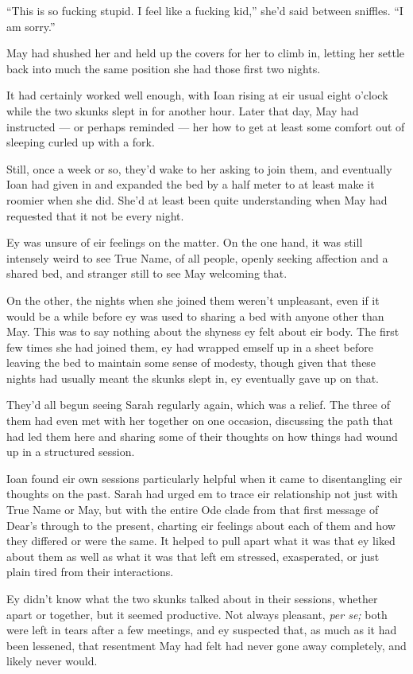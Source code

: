 ``This is so fucking stupid. I feel like a fucking kid,'' she'd said between sniffles. ``I am sorry.''

May had shushed her and held up the covers for her to climb in, letting her settle back into much the same position she had those first two nights.

It had certainly worked well enough, with Ioan rising at eir usual eight o'clock while the two skunks slept in for another hour. Later that day, May had instructed — or perhaps reminded — her how to get at least some comfort out of sleeping curled up with a fork.

Still, once a week or so, they'd wake to her asking to join them, and eventually Ioan had given in and expanded the bed by a half meter to at least make it roomier when she did. She'd at least been quite understanding when May had requested that it not be every night.

Ey was unsure of eir feelings on the matter. On the one hand, it was still intensely weird to see True Name, of all people, openly seeking affection and a shared bed, and stranger still to see May welcoming that.

On the other, the nights when she joined them weren't unpleasant, even if it would be a while before ey was used to sharing a bed with anyone other than May. This was to say nothing about the shyness ey felt about eir body. The first few times she had joined them, ey had wrapped emself up in a sheet before leaving the bed to maintain some sense of modesty, though given that these nights had usually meant the skunks slept in, ey eventually gave up on that.

They'd all begun seeing Sarah regularly again, which was a relief. The three of them had even met with her together on one occasion, discussing the path that had led them here and sharing some of their thoughts on how things had wound up in a structured session.

Ioan found eir own sessions particularly helpful when it came to disentangling eir thoughts on the past. Sarah had urged em to trace eir relationship not just with True Name or May, but with the entire Ode clade from that first message of Dear's through to the present, charting eir feelings about each of them and how they differed or were the same. It helped to pull apart what it was that ey liked about them as well as what it was that left em stressed, exasperated, or just plain tired from their interactions.

Ey didn't know what the two skunks talked about in their sessions, whether apart or together, but it seemed productive. Not always pleasant, \emph{per se;} both were left in tears after a few meetings, and ey suspected that, as much as it had been lessened, that resentment May had felt had never gone away completely, and likely never would.

